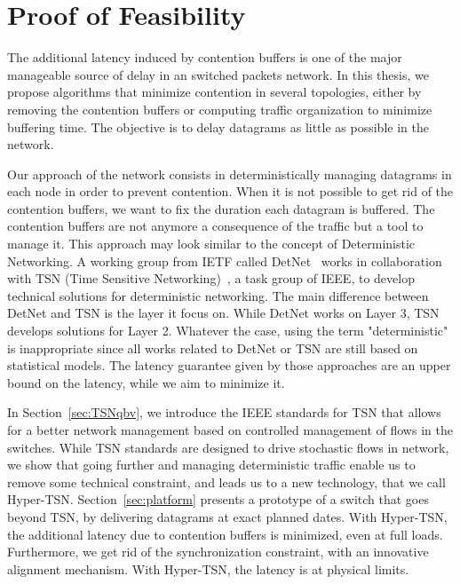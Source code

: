 
\chapter{Proof of Feasibility}
\label{chap:TSN}
\minitoc

The additional latency induced by contention buffers is one of the major manageable source of delay in an switched packets network.
In this thesis, we propose algorithms that minimize contention in several topologies, either by removing the contention buffers or computing traffic organization to minimize buffering time. The objective is to delay datagrams as little as possible in the network.

Our approach of the network consists in deterministically managing datagrams in each node in order to prevent contention. When it is not possible to get rid of the contention buffers, we want to fix the duration each datagram is buffered. The contention buffers are not anymore a consequence of the traffic but a tool to manage it. This approach may look similar to the concept of Deterministic Networking. A working group from IETF called DetNet~\cite{finn-detnet-architecture-08} works in collaboration with TSN (Time Sensitive Networking)~\cite{ieee802}, a task group of IEEE, to develop technical solutions for deterministic networking. The main difference between DetNet and TSN is the layer it focus on. While DetNet works on Layer 3, TSN develops solutions for Layer 2. Whatever the case, using the term "deterministic" is inappropriate since all works related to DetNet or TSN are still based on statistical models. The latency guarantee given by those approaches are an upper bound on the latency, while we aim to minimize it.

In Section~\ref{sec:TSNqbv}, we introduce the IEEE standards for TSN that allows for a better network management based on  controlled management of flows in the switches. While TSN standards are designed to drive stochastic flows in network, we show that going further and managing deterministic traffic enable us to remove some technical constraint, and leads us to a new technology, that we call Hyper-TSN. Section~\ref{sec:platform} presents a prototype of a switch that goes beyond TSN, by delivering datagrams at exact planned dates. With Hyper-TSN, the additional latency due to contention buffers is minimized, even at full loads. Furthermore, we get rid of the synchronization constraint, with an innovative alignment mechanism. With Hyper-TSN, the latency is at physical limits.
\cite{metricsietf}

